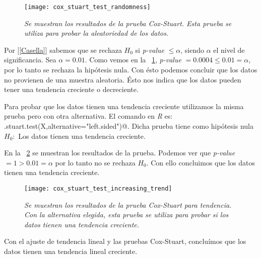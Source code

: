 \begin{figure}[H]
\centering
\texttt{[image: cox\_stuart\_test\_randomness]} %
\caption[\textit{Prueba Cox-Stuart para aleatoriedad}]{\textit{Se muestran los resultados de la prueba Cox-Stuart. Esta prueba se utiliza para probar la aleatoriedad de los datos.}}\label{coxStuartTest_randomness}
\end{figure}

%
%


Por [\ref{Casella}] sabemos que se rechaza $H_{0}$ si \textit{p-value} $ \leqslant \alpha$, siendo $\alpha$ el nivel de significancia. Sea $\alpha = 0.01$. Como vemos en la \figurename{~\ref{coxStuartTest_randomness}},  \textit{p-value} $ = 0.0004 \leqslant 0.01 = \alpha$, por lo tanto se rechaza la hipótesis nula. Con ésto podemos concluir que los datos no provienen de una muestra aleatoria. Ésto nos indica que los datos pueden tener una tendencia creciente o decreciente.

Para probar que los datos tienen una tendencia creciente utilizamos la misma prueba pero con otra alternativa. El comando en \textit{R} es: \verb@cox.stuart.test(X,alternative="left.sided")@. Dicha prueba tiene como hipótesis nula $H_{0}:$ Los datos tienen una tendencia creciente.

En la \figurename{~\ref{coxStuartTest_trend}} se muestran los resultados de la prueba. Podemos ver que \textit{p-value} $ = 1 > 0.01 = \alpha$ por lo tanto no se rechaza $H_{0}$. Con ello concluimos que los datos tienen una tendencia creciente.

\begin{figure}[H]
\centering
\texttt{[image: cox\_stuart\_test\_increasing\_trend]} %
\caption[\textit{Prueba Cox-Stuart para tendencia creciente}]{\textit{Se muestran los resultados de la prueba Cox-Stuart para tendencia. Con la alternativa elegida, esta prueba se utiliza para probar si los datos tienen una tendencia creciente.}}\label{coxStuartTest_trend}
\end{figure}

Con el ajuste de tendencia lineal y las pruebas Cox-Stuart, concluímos que los datos tienen una tendencia lineal creciente.

